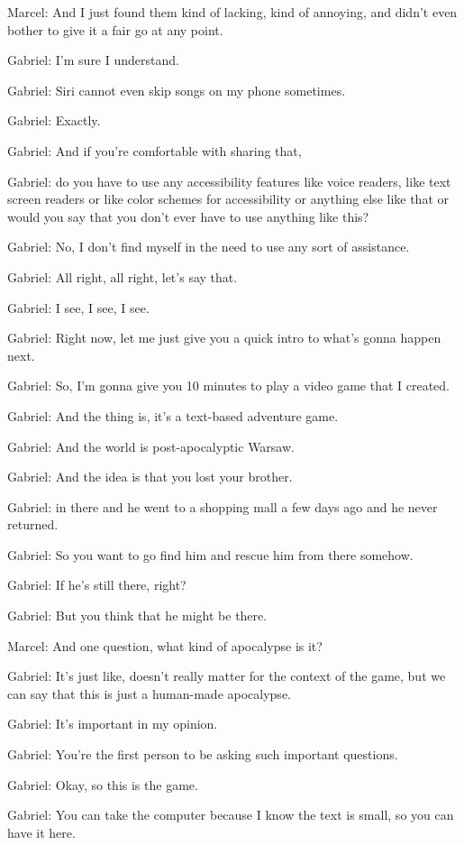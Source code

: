 Marcel: And I just found them kind of lacking, kind of annoying, and didn't even bother to give it a fair go at any point.

Gabriel: I'm sure I understand.

Gabriel: Siri cannot even skip songs on my phone sometimes.

Gabriel: Exactly.

Gabriel: And if you're comfortable with sharing that,

Gabriel: do you have to use any accessibility features like voice readers, like text screen readers or like color schemes for accessibility or anything else like that or would you say that you don't ever have to use anything like this?

Gabriel: No, I don't find myself in the need to use any sort of assistance.

Gabriel: All right, all right, let's say that.

Gabriel: I see, I see, I see.

Gabriel: Right now, let me just give you a quick intro to what's gonna happen next.

Gabriel: So, I'm gonna give you 10 minutes to play a video game that I created.

Gabriel: And the thing is, it's a text-based adventure game.

Gabriel: And the world is post-apocalyptic Warsaw.

Gabriel: And the idea is that you lost your brother.

Gabriel: in there and he went to a shopping mall a few days ago and he never returned.

Gabriel: So you want to go find him and rescue him from there somehow.

Gabriel: If he's still there, right?

Gabriel: But you think that he might be there.

Marcel: And one question, what kind of apocalypse is it?

Gabriel: It's just like, doesn't really matter for the context of the game, but we can say that this is just a human-made apocalypse.

Gabriel: It's important in my opinion.

Gabriel: You're the first person to be asking such important questions.

Gabriel: Okay, so this is the game.

Gabriel: You can take the computer because I know the text is small, so you can have it here.

